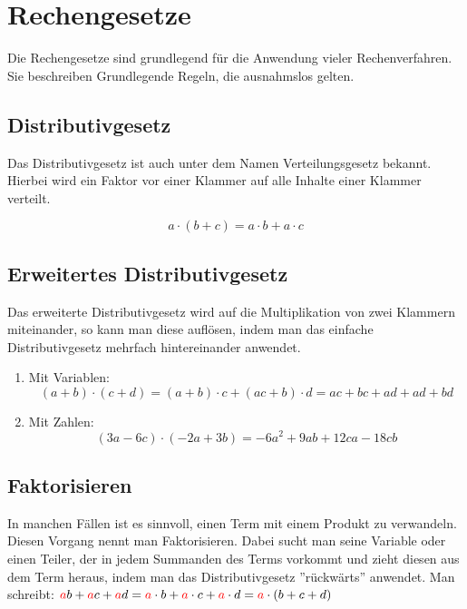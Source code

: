 
\section{Rechengesetze}\label{sec:Rechengesetzte}
Die Rechengesetze sind grundlegend für die Anwendung vieler Rechenverfahren. Sie beschreiben Grundlegende Regeln, die ausnahmslos gelten.

\subsection{Distributivgesetz}\label{sec:Distributivgesetzt}
Das Distributivgesetz ist auch unter dem Namen Verteilungsgesetz bekannt. Hierbei wird ein Faktor vor einer Klammer auf alle Inhalte einer Klammer verteilt. 

\begin{beispiel}
	\[a\cdot(b+c)=a\cdot b+a\cdot c\]
\end{beispiel}
\subsection{Erweitertes Distributivgesetz}\label{sec:Erweitertes Distributivgesetz}
Das erweiterte Distributivgesetz wird auf die Multiplikation von zwei Klammern miteinander, so kann man diese auflösen, indem man das einfache Distributivgesetz mehrfach hintereinander anwendet. 

\begin{beispiel}
	\begin{enumerate}
		\item Mit Variablen: \[(a+b)\cdot(c+d)=(a+b)\cdot c+(ac+b)\cdot d=ac+bc+ad+ad+bd\]
		\item Mit Zahlen: \[(3a-6c)\cdot (-2a+3b)=-6a^2+9ab+12ca-18cb\]
	\end{enumerate}
\end{beispiel}
\pagebreak
\subsection{Faktorisieren}\label{sec:Faktorisieren}
In manchen Fällen ist es sinnvoll, einen Term mit einem Produkt zu verwandeln. Diesen Vorgang nennt man Faktorisieren. Dabei sucht man seine Variable oder einen Teiler, der in jedem Summanden des Terms vorkommt und zieht diesen aus dem Term heraus, indem man das Distributivgesetz ''rückwärts'' anwendet.
Man schreibt: $\color {red}a\color {black}b+\color {red}a\color {black}c+\color {red}a\color {black}d=\color {red}a\color {black}\cdot b+\color {red}a\color {black}\cdot c+\color {red}a\color {black}\cdot d=\color {red}a\color {black}\cdot(b+c+d)$


